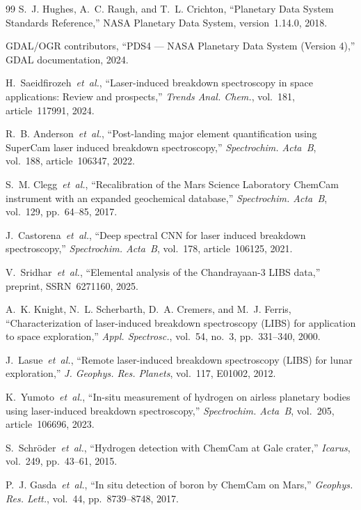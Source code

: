\documentclass[a4paper,twocolumn,10pt]{article}
\begin{document}
\begin{thebibliography}{99}
S.~J. Hughes, A.~C. Raugh, and T.~L. Crichton,
``Planetary Data System Standards Reference,''
NASA Planetary Data System, version~1.14.0, 2018.

GDAL/OGR contributors,
``PDS4 --- NASA Planetary Data System (Version 4),''
GDAL documentation, 2024.

H.~Saeidfirozeh~\emph{et~al.},
``Laser-induced breakdown spectroscopy in space applications:
Review and prospects,''
\textit{Trends Anal. Chem.}, vol.~181, article~117991, 2024.

R.~B. Anderson~\emph{et~al.},
``Post-landing major element quantification using SuperCam laser
induced breakdown spectroscopy,''
\textit{Spectrochim. Acta~B}, vol.~188, article~106347, 2022.

S.~M. Clegg~\emph{et~al.},
``Recalibration of the Mars Science Laboratory ChemCam instrument
with an expanded geochemical database,''
\textit{Spectrochim. Acta~B}, vol.~129, pp.~64--85, 2017.

J.~Castorena~\emph{et~al.},
``Deep spectral CNN for laser induced breakdown spectroscopy,''
\textit{Spectrochim. Acta~B}, vol.~178, article~106125, 2021.

V.~Sridhar~\emph{et~al.},
``Elemental analysis of the Chandrayaan-3 LIBS data,''
preprint, SSRN~6271160, 2025.

A.~K. Knight, N.~L. Scherbarth, D.~A. Cremers, and M.~J. Ferris,
``Characterization of laser-induced breakdown spectroscopy (LIBS)
for application to space exploration,''
\textit{Appl. Spectrosc.}, vol.~54, no.~3, pp.~331--340, 2000.

J.~Lasue~\emph{et~al.},
``Remote laser-induced breakdown spectroscopy (LIBS) for lunar
exploration,''
\textit{J. Geophys. Res. Planets}, vol.~117, E01002, 2012.

K.~Yumoto~\emph{et~al.},
``In-situ measurement of hydrogen on airless planetary bodies using
laser-induced breakdown spectroscopy,''
\textit{Spectrochim. Acta~B}, vol.~205, article~106696, 2023.

S.~Schr\"oder~\emph{et~al.},
``Hydrogen detection with ChemCam at Gale crater,''
\textit{Icarus}, vol.~249, pp.~43--61, 2015.

P.~J. Gasda~\emph{et~al.},
``In situ detection of boron by ChemCam on Mars,''
\textit{Geophys. Res. Lett.}, vol.~44, pp.~8739--8748, 2017.


\end{thebibliography}
\end{document}
